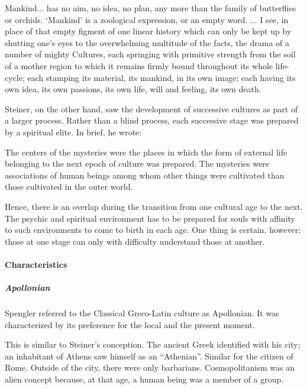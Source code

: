 \begin{quotex}
Mankind... has no aim, no idea, no plan, any more than the family of butterflies or orchids. `Mankind' is a zoological expression, or an empty word. ... I see, in place of that empty figment of one linear history which can only be kept up by shutting one's eyes to the overwhelming multitude of the facts, the drama of a number of mighty Cultures, each springing with primitive strength from the soil of a mother region to which it remains firmly bound throughout its whole life-cycle; each stamping its material, its mankind, in its own image; each having its own idea, its own passions, its own life, will and feeling, its own death.
\end{quotex}


Steiner, on the other hand, saw the development of successive cultures as part of a larger process. Rather than a blind process, each successive stage was prepared by a spiritual elite. In brief, he wrote:

\begin{quotex}
The centers of the mysteries were the places in which the form of external life belonging to the next epoch of culture was prepared. The mysteries were associations of human beings among whom other things were cultivated than those cultivated in the outer world.
\end{quotex}


Hence, there is an overlap during the transition from one cultural age to the next. The psychic and spiritual environment has to be prepared for souls with affinity to such environments to come to birth in each age. One thing is certain, however: those at one stage can only with difficulty understand those at another.

\paragraph{Characteristics}


\subparagraph{Apollonian}


Spengler referred to the Classical Greco-Latin culture as Apollonian. It was characterized by its preference for the local and the present moment.

This is similar to Steiner's conception. The ancient Greek identified with his city; an inhabitant of Athens saw himself as an ``Athenian''. Similar for the citizen of Rome. Outside of the city, there were only barbarians. Cosmopolitanism was an alien concept because, at that age, a human being was a member of a group.

